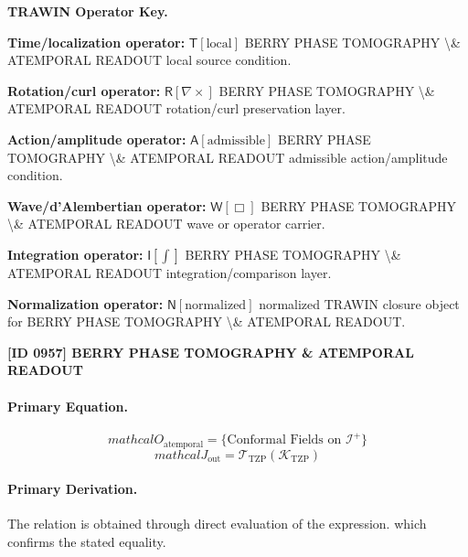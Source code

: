 \par\vspace{0.45\baselineskip}
\noindent\begin{minipage}[t]{\linewidth}
\begingroup
\small
\raggedright
\textbf{TRAWIN Operator Key.}\par
\noindent\textbf{Time/localization operator:} $\mathsf{T}\!\left[\mathrm{local}\right]$ BERRY PHASE TOMOGRAPHY \textbackslash{}\& ATEMPORAL READOUT local source condition.\par
\noindent\textbf{Rotation/curl operator:} $\mathsf{R}\!\left[\nabla\times\right]$ BERRY PHASE TOMOGRAPHY \textbackslash{}\& ATEMPORAL READOUT rotation/curl preservation layer.\par
\noindent\textbf{Action/amplitude operator:} $\mathsf{A}\!\left[\mathrm{admissible}\right]$ BERRY PHASE TOMOGRAPHY \textbackslash{}\& ATEMPORAL READOUT admissible action/amplitude condition.\par
\noindent\textbf{Wave/d'Alembertian operator:} $\mathsf{W}\!\left[\Box\right]$ BERRY PHASE TOMOGRAPHY \textbackslash{}\& ATEMPORAL READOUT wave or operator carrier.\par
\noindent\textbf{Integration operator:} $\mathsf{I}\!\left[\int\right]$ BERRY PHASE TOMOGRAPHY \textbackslash{}\& ATEMPORAL READOUT integration/comparison layer.\par
\noindent\textbf{Normalization operator:} $\mathsf{N}\!\left[\mathrm{normalized}\right]$ normalized TRAWIN closure object for BERRY PHASE TOMOGRAPHY \textbackslash{}\& ATEMPORAL READOUT.\par
\endgroup
\end{minipage}

\clearpage
\noindent\textbf{[ID 0957] BERRY PHASE TOMOGRAPHY \& ATEMPORAL READOUT}\par
\vspace{0.35em}
\paragraph{Primary Equation.}
\[
mathcal{O}_{\text{atemporal}} = \{\text{Conformal Fields on } \mathcal{I}^+\}
\]
\[
mathcal{J}_{\mathrm{out}} = \mathcal{T}_{\mathrm{TZP}}\!\left(\mathcal{K}_{\mathrm{TZP}}\right)
\]

\paragraph{Primary Derivation.}
The relation is obtained through direct evaluation of the expression. which confirms the stated equality.
